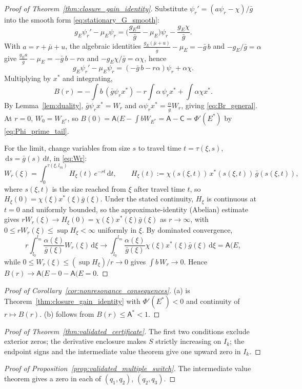 \documentclass[pdflatex,sn-mathphys-num]{sn-jnl}
\newcommand{\dd}{\,\mathrm{d}}
\theoremstyle{plain}
\theoremstyle{definition}
\theoremstyle{remark}
\begin{document}
\begin{proof}[Proof of Theorem~\ref{thm:closure_gain_identity}]
Substitute $\psi_r'=(a\psi_r-\chi)/\bar g$ into the smooth form
\eqref{eq:stationary_G_smooth}:
\[
g_E\psi_r'-\mu_E\psi_r
=\Big(\frac{g_E a}{\bar g}-\mu_E\Big)\psi_r-\frac{g_E\chi}{\bar g}.
\]
With $a=r+\bar\mu+u$, the algebraic identities
$\frac{g_E(\bar\mu+u)}{\bar g}-\mu_E=-\bar g\,b$ and $-g_E/\bar g=\alpha$ give
$\frac{g_E a}{\bar g}-\mu_E=-\bar g\,b-r\alpha$ and $-g_E\chi/\bar g=\alpha\chi$,
hence
\[
g_E\psi_r'-\mu_E\psi_r=(-\bar g\,b-r\alpha)\psi_r+\alpha\chi.
\]
Multiplying by $x^*$ and integrating,
\[
B(r)
=-\int b\,(\bar g\psi_r x^*)
-r\int\alpha\,\psi_r x^*
+\int\alpha\chi x^*.
\]
By Lemma~\ref{lem:duality}, $\bar g\psi_r x^*=W_r$ and
$\alpha\psi_r x^*=\frac{\alpha}{\bar g}W_r$, giving \eqref{eq:Br_general}. At $r=0$,
$W_0=W_{E^*}$, so $B(0)=\mathsf A(E-\int bW_{E^*}=\mathsf A-\mathsf C=\Phi'(E^*)$
by \eqref{eq:Phi_prime_tail}.

For the limit, change variables from size $s$ to travel time $t=\tau(\xi,s)$,
$\dd s=\bar g(s)\dd t$, in \eqref{eq:Wr}:
\[
W_r(\xi)=\int_0^{\tau(\xi,l_m)}H_\xi(t)\,e^{-rt}\dd t,
\qquad
H_\xi(t):=\chi(s(\xi,t))\,x^*(s(\xi,t))\,\bar g(s(\xi,t)),
\]
where $s(\xi,t)$ is the size reached from $\xi$ after travel time $t$, so
$H_\xi(0)=\chi(\xi)x^*(\xi)\bar g(\xi)$. Under the stated continuity, $H_\xi$ is
continuous at $t=0$ and uniformly bounded, so the approximate-identity (Abelian)
estimate gives $rW_r(\xi)\to H_\xi(0)=\chi(\xi)x^*(\xi)\bar g(\xi)$ as
$r\to\infty$, with $0\le rW_r(\xi)\le\sup H_\xi<\infty$ uniformly in $\xi$. By
dominated convergence,
\[
r\int_{l_0}^{l_m}\frac{\alpha(\xi)}{\bar g(\xi)}W_r(\xi)\dd\xi
\longrightarrow
\int_{l_0}^{l_m}\frac{\alpha(\xi)}{\bar g(\xi)}\chi(\xi)x^*(\xi)\bar g(\xi)\dd\xi
=\mathsf A(E,
\]
while $0\le W_r(\xi)\le(\sup H_\xi)/r\to0$ gives $\int b\,W_r\to0$. Hence
$B(r)\to\mathsf A(E-0-\mathsf A(E=0$.
\end{proof}

\begin{proof}[Proof of Corollary~\ref{cor:nonresonance_consequences}]
(a) is Theorem~\ref{thm:closure_gain_identity} with
$\Phi'(E^*)<0$ and continuity of $r\mapsto B(r)$. (b) follows from
$B(r)\le\mathsf A^*<1$.
\end{proof}

\begin{proof}[Proof of Theorem~\ref{thm:validated_certificate}]
The first two conditions exclude exterior zeros; the derivative enclosure makes
$S$ strictly increasing on $I_k$; the endpoint signs and the intermediate value
theorem give one upward zero in $I_k$.
\end{proof}

\begin{proof}[Proof of Proposition~\ref{prop:validated_multiple_switch}]
The intermediate value theorem gives a zero in each of $(q_1,q_2)$, $(q_2,q_3)$.
\end{proof}


\end{document}
